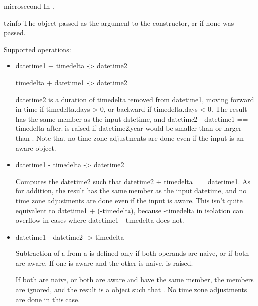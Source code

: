 \begin{memberdesc}{microsecond}
  In .
\end{memberdesc}

\begin{memberdesc}{tzinfo}
  The object passed as the  argument to the
   constructor, or  if none was passed.
\end{memberdesc}

Supported operations:

\begin{itemize}
  \item
    datetime1 + timedelta -> datetime2

    timedelta + datetime1 -> datetime2

    datetime2 is a duration of timedelta removed from datetime1, moving
    forward in time if timedelta.days > 0, or backward if
    timedelta.days < 0.  The result has the same  member
    as the input datetime, and datetime2 - datetime1 == timedelta after.
     is raised if datetime2.year would be
    smaller than  or larger than .
    Note that no time zone adjustments are done even if the input is an
    aware object.

  \item
    datetime1 - timedelta -> datetime2

    Computes the datetime2 such that datetime2 + timedelta == datetime1.
    As for addition, the result has the same  member
    as the input datetime, and no time zone adjustments are done even
    if the input is aware.
    This isn't quite equivalent to datetime1 + (-timedelta), because
    -timedelta in isolation can overflow in cases where
    datetime1 - timedelta does not.

  \item
    datetime1 - datetime2 -> timedelta

    Subtraction of a  from a
     is defined only if both
    operands are naive, or if both are aware.  If one is aware and the
    other is naive,  is raised.

    If both are naive, or both are aware and have the same 
    member, the  members are ignored, and the result is
    a  object  such that
    .  No time zone
    adjustments are done in this case.


\end{itemize}
